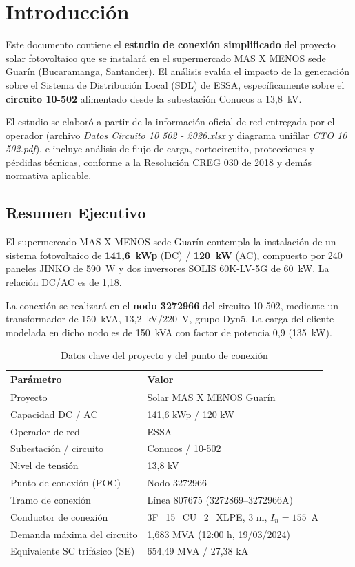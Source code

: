 \chapter{Introducción}

Este documento contiene el \textbf{estudio de conexión simplificado} del proyecto solar fotovoltaico que se instalará en el supermercado MAS X MENOS sede Guarín (Bucaramanga, Santander). El análisis evalúa el impacto de la generación sobre el Sistema de Distribución Local (SDL) de ESSA, específicamente sobre el \textbf{circuito 10-502} alimentado desde la subestación Conucos a 13,8~kV.

El estudio se elaboró a partir de la información oficial de red entregada por el operador (archivo \textit{Datos Circuito 10 502 - 2026.xlsx} y diagrama unifilar \textit{CTO 10 502.pdf}), e incluye análisis de flujo de carga, cortocircuito, protecciones y pérdidas técnicas, conforme a la Resolución CREG 030 de 2018 y demás normativa aplicable.

\section{Resumen Ejecutivo}

El supermercado MAS X MENOS sede Guarín contempla la instalación de un sistema fotovoltaico de \textbf{141,6~kWp} (DC) / \textbf{120~kW} (AC), compuesto por 240 paneles JINKO de 590~W y dos inversores SOLIS 60K-LV-5G de 60~kW. La relación DC/AC es de 1,18.

La conexión se realizará en el \textbf{nodo 3272966} del circuito 10-502, mediante un transformador de 150~kVA, 13,2~kV/220~V, grupo Dyn5. La carga del cliente modelada en dicho nodo es de 150~kVA con factor de potencia 0,9 (135~kW).

\begin{table}[H]
    \centering
    \caption{Datos clave del proyecto y del punto de conexión}
    \begin{tabular}{ll}
    \toprule
    \textbf{Parámetro} & \textbf{Valor} \\
    \midrule
    Proyecto & Solar MAS X MENOS Guarín \\
    Capacidad DC / AC & 141,6 kWp / 120 kW \\
    Operador de red & ESSA \\
    Subestación / circuito & Conucos / 10-502 \\
    Nivel de tensión & 13,8 kV \\
    Punto de conexión (POC) & Nodo 3272966 \\
    Tramo de conexión & Línea 807675 (3272869--3272966A) \\
    Conductor de conexión & 3F\_15\_CU\_2\_XLPE, 3 m, $I_n=155$~A \\
    Demanda máxima del circuito & 1,683 MVA (12:00 h, 19/03/2024) \\
    Equivalente SC trifásico (SE) & 654,49 MVA / 27,38 kA \\
    \bottomrule
    \end{tabular}
\end{table}

